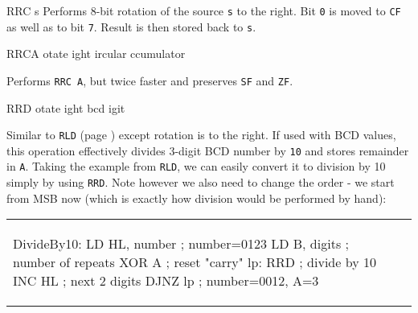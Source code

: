 \begin{basedescript}{
	\desclabelstyle{\multilinelabel}
	\desclabelwidth{3cm}}
\begin{DetailItem}{RRC s}
		Performs 8-bit rotation of the source {\tt s} to the right. Bit {\tt 0} is moved to {\tt CF} as well as to bit {\tt 7}. Result is then stored back to {\tt s}.

		\begin{DetailEffects}[p]
			\FlagsRRCr
		\end{DetailEffects}
						
		\begin{DetailTiming}
		\end{DetailTiming}

	\end{DetailItem}

	\begin{DetailItem}{RRCA}
		{otate ight ircular ccumulator}
		{\SymRRC{A}}

		Performs {\tt RRC A}, but twice faster and preserves {\tt SF} and {\tt ZF}.

		\begin{DetailEffects}
			\FlagsRRCA
		\end{DetailEffects}
						
		\begin{DetailTiming}
			\DetailTime{1}{4}
		\end{DetailTiming}

	\end{DetailItem}

	\begin{DetailItem}{RRD}
		{otate ight bcd igit}
		{\SymRRD}
		
		Similar to {\tt RLD} (page \pageref{DetailRefRLD}) except rotation is to the right. If used with BCD values, this operation effectively divides 3-digit BCD number by {\tt 10} and stores remainder in {\tt A}. Taking the example from {\tt RLD}, we can easily convert it to division by 10 simply by using {\tt RRD}. Note however we also need to change the order - we start from MSB now (which is exactly how division would be performed by hand):

		\pagebreak %
		\begin{tabular}{m{8cm}p{0.1cm}m{4.3cm}}

			{ %
			\begin{tcblisting}{}
DivideBy10:
	LD HL, number	; number=0123
	LD B, digits	; number of repeats
	XOR A			; reset "carry"
lp:	RRD				; divide by 10 
	INC HL			; next 2 digits
	DJNZ lp			; number=0012, A=3


\end{tcblisting}}
\end{tabular}
\end{DetailItem}
\end{basedescript}

